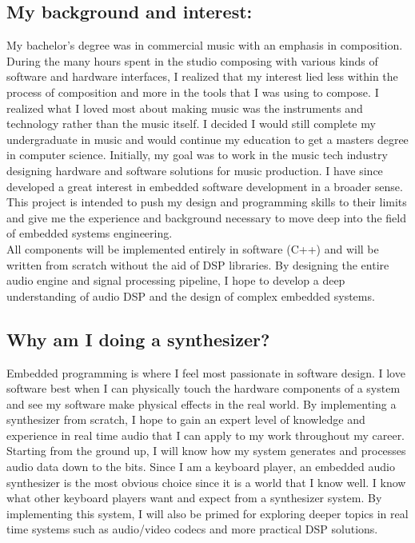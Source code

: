 \documentclass[12pt]{article}
\begin{document}
\subsection{My background and interest:}
My bachelor’s degree was in commercial music with an emphasis in composition. During the many hours spent in the studio composing with various kinds of software and hardware interfaces, I realized that my interest lied less within the process of composition and more in the tools that I was using to compose. I realized what I loved most about making music was the instruments and technology rather than the music itself. I decided I would still complete my undergraduate in music and would continue my education to get a masters degree in computer science. Initially, my goal was to work in the music tech industry designing hardware and software solutions for music production. I have since developed a great interest in embedded software development in a broader sense. This project is intended to push my design and programming skills to their limits and give me the experience and background necessary to move deep into the field of embedded systems engineering.
\\
All components will be implemented entirely in software (C++) and will be written from scratch without the aid of DSP libraries. By designing the entire audio engine and signal processing pipeline, I hope to develop a deep understanding of audio DSP and the design of complex embedded systems.
\\
\subsection{Why am I doing a synthesizer?}
Embedded programming is where I feel most passionate in software design. I love software best when I can physically touch the hardware components of a system and see my software make physical effects in the real world. By implementing a synthesizer from scratch, I hope to gain an expert level of knowledge and experience in real time audio that I can apply to my work throughout my career. Starting from the ground up, I will know how my system generates and processes audio data down to the bits. Since I am a keyboard player, an embedded audio synthesizer is the most obvious choice since it is a world that I know well. I know what other keyboard players want and expect from a synthesizer system. By implementing this system, I will also be primed for exploring deeper topics in real time systems such as audio/video codecs and more practical DSP solutions.
\end{document}
